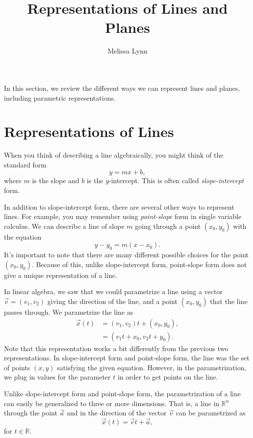 \documentclass{ximera}
\title{Representations of Lines and Planes}
\author{Melissa Lynn}
\begin{document}
  
\begin{abstract}  
\end{abstract}  
\maketitle 

In this section, we review the different ways we can represent lines and planes, including parametric representations.

\section*{Representations of Lines}

When you think of describing a line algebraically, you might think of the standard form
\[
y = mx + b,
\]
where $m$ is the slope and $b$ is the $y$-intercept. This is often called \emph{slope-intercept} form.

 In addition to slope-intercept form, there are several other ways to represent lines. For example, you may remember using \emph{point-slope} form in single variable calculus. We can describe a line of slope $m$ going through a point $(x_0, y_0)$ with the equation
 \[
 y-y_0 = m(x-x_0).
 \]
 It's important to note that there are many different possible choices for the point $(x_0,y_0)$. Because of this, unlike slope-intercept form, point-slope form does not give a unique representation of a line.
 
 In linear algebra, we saw that we could parametrize a line using a vector $\vec{v}=(v_1,v_2)$ giving the direction of the line, and a point $(x_0, y_0)$ that the line passes through. We parametrize the line as
 \begin{align*}
 \vec{x}(t) &= (v_1,v_2)t+ (x_0, y_0),\\
 &= (v_1t+x_0, v_2t+y_0).
 \end{align*}
 Note that this representation works a bit differently from the previous two representations. In slope-intercept form and point-slope form, the line was the set of points $(x,y)$ satisfying the given equation. However, in the parametrization, we plug in values for the parameter $t$ in order to get points on the line.
 
 Unlike slope-intercept form and point-slope form, the parametrization of a line can easily be generalized to three or more dimensions. That is, a line in $\mathbb{R}^n$ through the point $\vec{a}$ and in the direction of the vector $\vec{v}$ can be parametrized as
 \[
 \vec{x}(t) = \vec{v}t + \vec{a},
 \]
 for $t\in\mathbb{R}$. 
 
\end{document}
